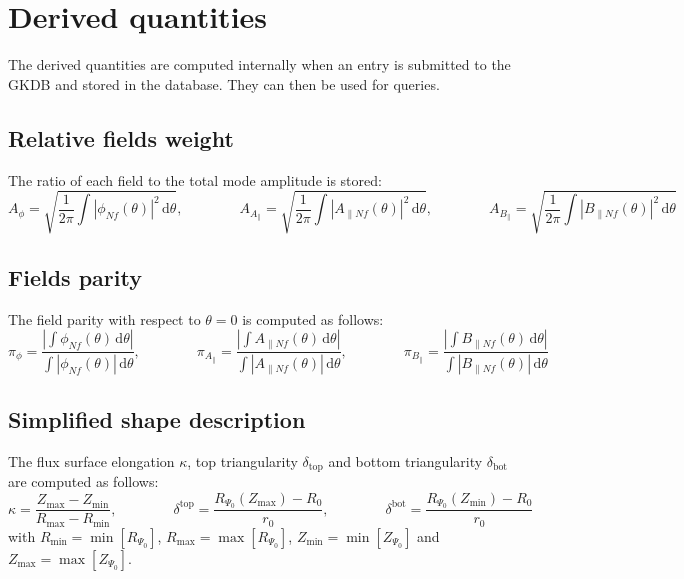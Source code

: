 \documentclass[a4paper]{report}
\begin{document}
\chapter{Derived quantities}
The derived quantities are computed internally when an entry is submitted to the GKDB and stored in the database. They can then be used for queries. 

\section{Relative fields weight} \label{sec:fields:weight}
The ratio of each field to the total mode amplitude is stored:
\begin{equation*}
A_\phi = \sqrt{\frac{1}{2\pi}\int |\phi_{Nf}(\theta)|^2\,\textrm{d}\theta}, \qquad \qquad
A_{A_\parallel} = \sqrt{\frac{1}{2\pi}\int |A_{\parallel Nf}(\theta)|^2\,\textrm{d}\theta}, \qquad \qquad
A_{B_\parallel} = \sqrt{\frac{1}{2\pi}\int |B_{\parallel Nf}(\theta)|^2\,\textrm{d}\theta}
\end{equation*}

\section{Fields parity} \label{sec:fields:parity}
The field parity with respect to $\theta=0$ is computed as follows:
\begin{equation*}
\pi_\phi = \frac{\left| \int \phi_{Nf}(\theta) \,\textrm{d}\theta \right|}{\int |\phi_{Nf}(\theta)| \,\textrm{d}\theta}, \qquad \qquad 
\pi_{A_\parallel} = \frac{\left| \int A_{\parallel Nf}(\theta) \,\textrm{d}\theta \right|}{\int |A_{\parallel Nf}(\theta)| \,\textrm{d}\theta}, \qquad \qquad 
\pi_{B_\parallel} = \frac{\left| \int B_{\parallel Nf}(\theta) \,\textrm{d}\theta \right|}{\int |B_{\parallel Nf}(\theta)| \,\textrm{d}\theta}
\end{equation*}

\section{Simplified shape description}
The flux surface elongation $\kappa$, top triangularity $\delta_\textrm{top}$ and bottom triangularity $\delta_\textrm{bot}$ are computed as follows:
\begin{equation*}
\kappa = \frac{Z_\textrm{max}-Z_\textrm{min}}{R_\textrm{max}-R_\textrm{min}}, \qquad \qquad \delta^\textrm{top} = \frac{R_{\Psi_0}(Z_\textrm{max})-R_0}{r_0}, \qquad \qquad \delta^\textrm{bot} = \frac{R_{\Psi_0}(Z_\textrm{min})-R_0}{r_0}
\end{equation*}
with $R_\textrm{min}=\min[R_{\Psi_0}]$, $R_\textrm{max}=\max[R_{\Psi_0}]$, $Z_\textrm{min}=\min[Z_{\Psi_0}]$ and $Z_\textrm{max}=\max[Z_{\Psi_0}]$.
\end{document}
